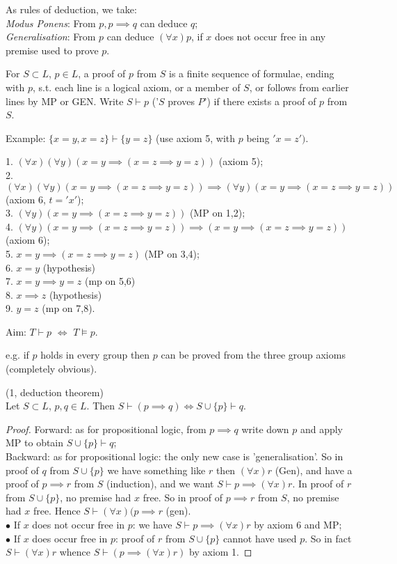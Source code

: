 \documentclass[a4paper]{article}
\begin{document}
As rules of deduction, we take:\\
\emph{Modus Ponens}: From $p,p \implies q$ can deduce $q$;\\
\emph{Generalisation}: From $p$ can deduce $(\forall x)p$, if $x$ does not occur free in any premise used to prove $p$.

For $S \subset L$, $p \in L$, a proof of $p$ from $S$ is a finite sequence of formulae, ending with $p$, s.t. each line is a logical axiom, or a member of $S$, or follows from earlier lines by MP or GEN. Write $S\vdash p$ ('$S$ proves $P$') if there exists a proof of $p$ from $S$.

Example: $\{x=y,x=z\} \vdash\{y=z\}$ (use axiom 5, with $p$ being $'x=z')$.

1. $(\forall x)(\forall y) (x=y \implies (x=z \implies y=z))$ (axiom 5);\\
2. $(\forall x)(\forall y)(x=y \implies (x=z \implies y=z)) \implies (\forall y)(x=y \implies (x=z \implies y=z))$ (axiom 6, $t='x'$);\\
3. $(\forall y)(x=y \implies (x=z \implies y=z))$ (MP on 1,2);\\
4. $(\forall y) (x=y \implies (x=z \implies y=z)) \implies (x=y \implies (x=z \implies y=z))$ (axiom 6);\\
5. $x=y \implies (x=z \implies y=z)$ (MP on 3,4);\\
6. $x=y$ (hypothesis)\\
7. $x=y \implies y=z$ (mp on 5,6)\\
8. $x \implies z$ (hypothesis)\\
9. $y=z$ (mp on 7,8).

Aim: $T \vdash p$ $\iff$ $T \vDash p$.

e.g. if $p$ holds in every group then $p$ can be proved from the three group axioms (completely obvious).

\begin{prop} (1, deduction theorem)\\
Let $S \subset L$, $p,q \in L$. Then $S \vdash (p\implies q) \iff S \cup \{p\} \vdash q$.
\begin{proof}
Forward: as for propositional logic, from $p \implies q$ write down $p$ and apply MP to obtain $S \cup \{p\} \vdash q$;\\
Backward: as for propositional logic: the only new case is 'generalisation'. So in proof of $q$ from $S \cup \{p\}$ we have something like $r$ then $(\forall x) r$ (Gen), and have a proof of $p \implies r$ from $S$ (induction), and we want $S \vdash p \implies (\forall x) r$. In proof of $r$ from $S \cup \{p\}$, no premise had $x$ free. So in proof of $p \implies r$ from $S$, no premise had $x$ free. Hence $S \vdash (\forall x)(p \implies r$ (gen).\\
$\bullet$ If $x$ does not occur free in $p$: we have $S \vdash p \implies (\forall x) r$ by axiom 6 and MP;\\
$\bullet$ If $x$ does occur free in $p$: proof of $r$ from $S \cup \{p\}$ cannot have used $p$. So in fact $S \vdash (\forall x) r$ whence $S \vdash (p \implies (\forall x) r)$ by axiom 1.
\end{proof}
\end{prop}
\end{document}
